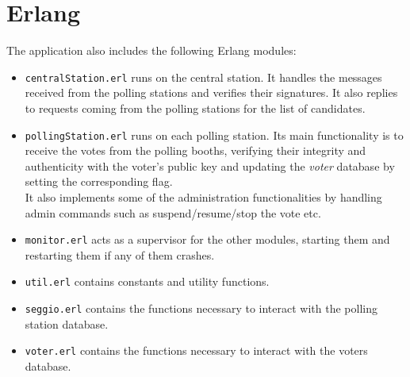 %
\chapter{Erlang}\label{ch:erlang}
The application also includes the following Erlang modules:
\hfill \break
{}

\begin{itemize}

	\item \texttt{centralStation.erl} runs on the central station. It handles the messages received from the polling stations and verifies their signatures. It also replies to requests coming from the polling stations for the list of candidates.
	\item \texttt{pollingStation.erl} runs on each polling station. Its main functionality is to receive the votes from the polling booths, verifying their integrity and authenticity with the voter's public key and updating the \textit{voter} database by setting the corresponding flag.\\
	 It also implements some of the administration functionalities by handling admin commands such as suspend/resume/stop the vote etc.
	 \item \texttt{monitor.erl} acts as a supervisor for the other modules, starting them and restarting them if any of them crashes.
	 \item \texttt{util.erl} contains constants and utility functions.
	 \item \texttt{seggio.erl} contains the functions necessary to interact with the polling station database.
	 \item \texttt{voter.erl} contains the functions necessary to interact with the voters database.

\end{itemize}